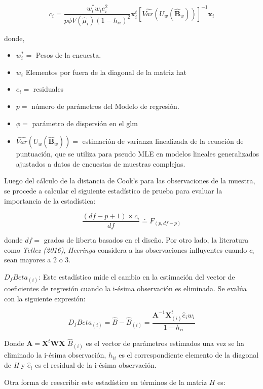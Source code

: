\documentclass[
  12pt,
]{book}
\providecommand{\tightlist}{%
  \setlength{\itemsep}{0pt}\setlength{\parskip}{0pt}}
\begin{document}
\[
c_{i}=\frac{w_{i}^{*}w_{i}e_{i}^{2}}{p\phi V\left(\hat{\mu}_{i}\right)\left(1-h_{ii}\right)^{2}}\boldsymbol{x}_{i}^{t}\left[\widehat{Var}\left(U_{w}\left(\hat{\boldsymbol{B}}_{w}\right)\right)\right]^{-1}\boldsymbol{x}_{i}
\]

donde,

\begin{itemize}
\tightlist
\item
  \(w_i^* =\) Pesos de la encuesta.
\item
  \(w_i\) Elementos por fuera de la diagonal de la matriz hat
\item
  \(e_i=\) residuales
\item
  \(p=\) número de parámetros del Modelo de regresión.
\item
  \(\phi =\) parámetro de dispersión en el glm
\item
  \(\widehat{Var}\left(U_{w}\left(\hat{\boldsymbol{B}}_{w}\right)\right) =\) estimación de varianza linealizada de la ecuación de puntuación, que se utiliza para pseudo MLE en modelos lineales generalizados ajustados a datos de encuestas de muestras complejas.
\end{itemize}

Luego del cálculo de la distancia de Cook's para las observaciones de la muestra, se procede a calcular el siguiente estadístico de prueba para evaluar la importancia de la estadística:

\[
\frac{\left(df-p+1\right)\times c_{i}}{df} \doteq F_{\left(p,df-p\right)}
\]

donde \(df=\) grados de liberta basados en el diseño. Por otro lado, la literatura como \emph{Tellez (2016)}, \emph{Heeringa} considera a las observaciones influyentes cuando \(c_{i}\) sean mayores a 2 o 3.

\emph{\(D_fBeta_{(i)}\)}: Este estadístico mide el cambio en la estimación
del vector de coeficientes de regresión cuando la i-ésima observación
es eliminada. Se evalúa con la siguiente expresión:

\[
D_fBeta_{(i)} = \hat{B}-\hat{B}_{\left(i\right)}=\frac{\boldsymbol{A}^{-1}\boldsymbol{X}_{\left(i\right)}^{t}\hat{e}_{i}w_{i}}{1-h_{ii}}
\]

Donde \(\boldsymbol{A} =\boldsymbol{X}^{t}\boldsymbol{WX}\) \(\hat{B}_{(i)}\) es el vector de parámetros estimados una vez se ha eliminado la
i-ésima observación, \(h_{ii}\) es el correspondiente elemento de la diagonal de \emph{H} y \(\hat{e}_i\) es el residual de la i-ésima observación.

Otra forma de reescribir este estadístico en términos de la matriz \(H\) es:
\end{document}
